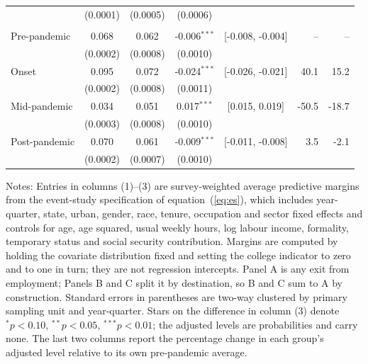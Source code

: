 \begin{table}[H]
\begin{threeparttable}
\begin{tabular}{lccccrr}
 & (0.0001) & (0.0005) & (0.0006) & & & \\
\addlinespace
\multicolumn{7}{l}{\textit{Panel C. Exit into non-participation}} \\
\quad Pre-pandemic & 0.068 & 0.062 & -0.006$^{***}$ & [-0.008, -0.004] & -- & -- \\
 & (0.0002) & (0.0008) & (0.0010) & & & \\
\quad Onset & 0.095 & 0.072 & -0.024$^{***}$ & [-0.026, -0.021] & 40.1 & 15.2 \\
 & (0.0002) & (0.0008) & (0.0011) & & & \\
\quad Mid-pandemic & 0.034 & 0.051 & 0.017$^{***}$ & [0.015, 0.019] & -50.5 & -18.7 \\
 & (0.0003) & (0.0008) & (0.0010) & & & \\
\quad Post-pandemic & 0.070 & 0.061 & -0.009$^{***}$ & [-0.011, -0.008] & 3.5 & -2.1 \\
 & (0.0002) & (0.0007) & (0.0010) & & & \\
\bottomrule
\end{tabular}
\begin{tablenotes}[flushleft]\scriptsize
\item Notes: Entries in columns (1)--(3) are survey-weighted average predictive margins from the event-study specification of equation~(\ref{eq:es}), which includes year-quarter, state, urban, gender, race, tenure, occupation and sector fixed effects and controls for age, age squared, usual weekly hours, log labour income, formality, temporary status and social security contribution. Margins are computed by holding the covariate distribution fixed and setting the college indicator to zero and to one in turn; they are not regression intercepts. Panel A is any exit from employment; Panels B and C split it by destination, so B and C sum to A by construction. Standard errors in parentheses are two-way clustered by primary sampling unit and year-quarter. Stars on the difference in column (3) denote $^{*}p<0.10$, $^{**}p<0.05$, $^{***}p<0.01$; the adjusted levels are probabilities and carry none. The last two columns report the percentage change in each group's adjusted level relative to its own pre-pandemic average.
\end{tablenotes}
\end{threeparttable}
\end{table}
